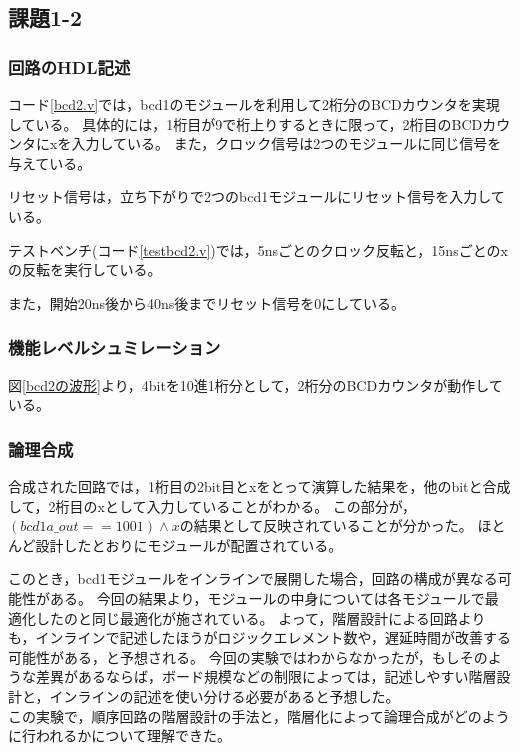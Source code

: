\subsection*{課題1-2}
\subsubsection{回路のHDL記述}
コード\ref{bcd2.v}では，bcd1のモジュールを利用して2桁分のBCDカウンタを実現している。
具体的には，1桁目が9で桁上りするときに限って，2桁目のBCDカウンタにxを入力している。
また，クロック信号は2つのモジュールに同じ信号を与えている。

リセット信号は，立ち下がりで2つのbcd1モジュールにリセット信号を入力している。

テストベンチ(コード\ref{testbcd2.v})では，5nsごとのクロック反転と，15nsごとのxの反転を実行している。

また，開始20ns後から40ns後までリセット信号を0にしている。

\subsubsection{機能レベルシュミレーション}
図\ref{bcd2の波形}より，4bitを10進1桁分として，2桁分のBCDカウンタが動作している。

\subsubsection{論理合成}
合成された回路では，1桁目の2bit目とxをとって演算した結果を，他のbitと合成して，2桁目のxとして入力していることがわかる。
この部分が，$(bcd1a\_out == 1001) \land x$の結果として反映されていることが分かった。
ほとんど設計したとおりにモジュールが配置されている。

このとき，bcd1モジュールをインラインで展開した場合，回路の構成が異なる可能性がある。
今回の結果より，モジュールの中身については各モジュールで最適化したのと同じ最適化が施されている。
よって，階層設計による回路よりも，インラインで記述したほうがロジックエレメント数や，遅延時間が改善する可能性がある，と予想される。
今回の実験ではわからなかったが，もしそのような差異があるならば，ボード規模などの制限によっては，記述しやすい階層設計と，インラインの記述を使い分ける必要があると予想した。\\

この実験で，順序回路の階層設計の手法と，階層化によって論理合成がどのように行われるかについて理解できた。
